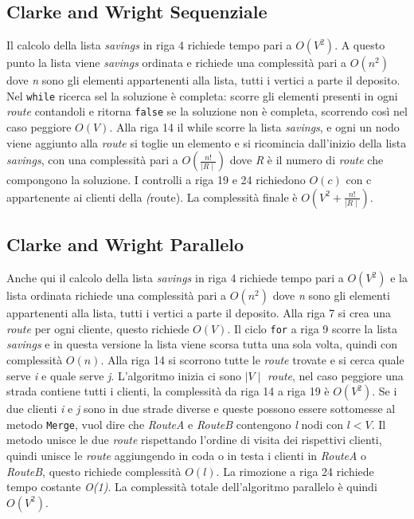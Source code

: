 \documentclass[]{article}
\begin{document}
\subsection{Clarke and Wright Sequenziale} 
Il calcolo della lista \textit{savings} in riga 4 richiede tempo pari a \emph{$O(V^2)$}. A questo punto la lista viene \textit{savings} ordinata e richiede una complessità pari a \emph{$O(n^2)$} dove \emph{n} sono gli elementi appartenenti alla lista, tutti i vertici a parte il deposito. Nel \texttt{while} ricerca sel la soluzione è completa: scorre gli elementi presenti in ogni \emph{route} contandoli e ritorna \texttt{false} se la soluzione non è completa, scorrendo così nel caso peggiore  \emph{$O(V)$}. Alla riga 14 il while scorre la lista  \textit{savings}, e ogni un nodo viene aggiunto alla \emph{route} si toglie un elemento e si ricomincia dall'inizio della lista \textit{savings}, con una complessità pari a  \emph{$O(\frac{n!}{\mid R \mid })$} dove \emph{R} è il numero di \emph{route} che compongono la soluzione. I controlli a riga 19 e 24 richiedono \emph{$O(c)$} con c appartenente ai clienti della \emph(route). La complessità finale è  \emph{$ O(V^2 + \frac{n!}{\mid R \mid })$}.

\subsection{Clarke and Wright Parallelo}
Anche qui il calcolo della lista \textit{savings} in riga 4 richiede tempo pari a \emph{$O(V^2)$} e la lista  ordinata richiede una complessità pari a \emph{$O(n^2)$} dove \emph{n} sono gli elementi appartenenti alla lista, tutti i vertici a parte il deposito. Alla riga 7 si crea una \emph{route} per ogni cliente, questo richiede \emph{$O(V)$}. Il ciclo \texttt{for} a riga 9 scorre la lista \textit{savings} e in questa versione la lista viene scorsa tutta una sola volta, quindi con complessità \emph{$O(n)$}. Alla riga 14 si scorrono tutte le \emph{route} trovate e si cerca quale serve \emph{i} e quale serve \emph{j}. L'algoritmo inizia ci sono \emph{$\mid V \mid$} \emph{route}, nel caso peggiore una strada contiene tutti i clienti, la complessità da riga 14 a riga 19 è \emph{$O(V^2)$}. Se i due clienti \emph{i} e \emph{j} sono in due strade diverse e queste possono essere sottomesse al metodo \texttt{Merge}, vuol dire che \textit{RouteA} e \textit{RouteB} contengono \emph{l} nodi con \emph{$l < V$}. Il metodo unisce le due \emph{route} rispettando l'ordine di visita dei rispettivi clienti, quindi unisce le \emph{route} aggiungendo in coda o in testa i clienti in \textit{RouteA} o \textit{RouteB}, questo richiede complessità \emph{$O(l)$}. La rimozione a riga 24 richiede tempo costante \emph{O(1)}. La complessità totale dell'algoritmo parallelo è quindi \emph{$O(V^2)$}.	
\end{document}
